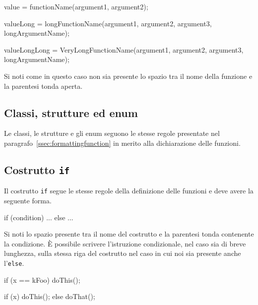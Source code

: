 \noindent\begin{minipage}[t]{\rbwidth}
\begin{RightCode}
value = functionName(argument1, argument2);

valueLong = longFunctionName(argument1, argument2, argument3,
                             longArgumentName);

valueLongLong = VeryLongFunctionName(argument1,
                                     argument2,
                                     argument3,
                                     longArgumentName);
\end{RightCode}
\end{minipage}%

Si noti come in questo caso non sia presente lo spazio tra il nome della funzione e la parentesi tonda aperta.

\subsection{Classi, strutture ed enum}

Le classi, le strutture e gli enum seguono le stesse regole presentate nel paragrafo~\ref{ssec:formattingfunction} in merito alla dichiarazione delle funzioni.

\subsection{Costrutto \texttt{if}}

Il costrutto \texttt{if} segue le stesse regole della definizione delle funzioni e deve avere la seguente forma.

\noindent\begin{minipage}[t]{\rbwidth}
\begin{RightCode}
if (condition)
{
  ...
}
else
{
  ...
}
\end{RightCode}
\end{minipage}%

Si noti lo spazio presente tra il nome del costrutto e la parentesi tonda contenente la condizione.
È possibile scrivere l'istruzione condizionale, nel caso sia di breve lunghezza, sulla stessa riga del costrutto nel caso in cui noi sia presente anche l'\texttt{else}.

\noindent\begin{minipage}[t]{\cbwidth}
\begin{RightCode}
if (x == kFoo) doThis();
\end{RightCode}
\end{minipage}%
\hspace{\cbdistance}
\begin{minipage}[t]{\cbwidth}
\begin{ErrorCode}
if (x) doThis();
else doThat();
\end{ErrorCode}
\end{minipage}

